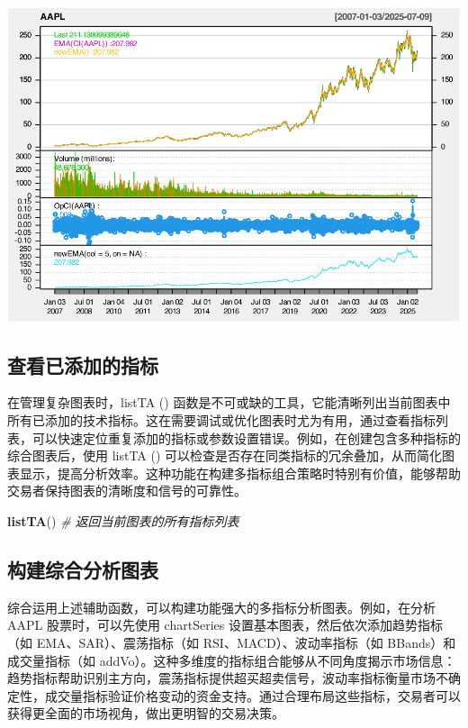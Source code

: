 \documentclass[]{ctexbook}
\newenvironment{Shaded}{\begin{snugshade}}{\end{snugshade}}
\newcommand{\CommentTok}[1]{\textcolor[rgb]{0.56,0.35,0.01}{\textit{#1}}}
\newcommand{\FunctionTok}[1]{\textcolor[rgb]{0.13,0.29,0.53}{\textbf{#1}}}
\newcommand{\NormalTok}[1]{#1}
\begin{document}
\includegraphics[width=0.9\linewidth]{quantmod_files/figure-latex/newta-5}

\subsection{查看已添加的指标}\label{ux67e5ux770bux5df2ux6dfbux52a0ux7684ux6307ux6807}

在管理复杂图表时，listTA () 函数是不可或缺的工具，它能清晰列出当前图表中所有已添加的技术指标。这在需要调试或优化图表时尤为有用，通过查看指标列表，可以快速定位重复添加的指标或参数设置错误。例如，在创建包含多种指标的综合图表后，使用 listTA () 可以检查是否存在同类指标的冗余叠加，从而简化图表显示，提高分析效率。这种功能在构建多指标组合策略时特别有价值，能够帮助交易者保持图表的清晰度和信号的可靠性。

\begin{Shaded}
\begin{Highlighting}[]
\FunctionTok{listTA}\NormalTok{()  }\CommentTok{\# 返回当前图表的所有指标列表}
\end{Highlighting}
\end{Shaded}

\subsection{构建综合分析图表}\label{ux6784ux5efaux7efcux5408ux5206ux6790ux56feux8868}

综合运用上述辅助函数，可以构建功能强大的多指标分析图表。例如，在分析 AAPL 股票时，可以先使用 chartSeries 设置基本图表，然后依次添加趋势指标（如 EMA、SAR）、震荡指标（如 RSI、MACD）、波动率指标（如 BBands）和成交量指标（如 addVo）。这种多维度的指标组合能够从不同角度揭示市场信息：趋势指标帮助识别主方向，震荡指标提供超买超卖信号，波动率指标衡量市场不确定性，成交量指标验证价格变动的资金支持。通过合理布局这些指标，交易者可以获得更全面的市场视角，做出更明智的交易决策。
\end{document}
